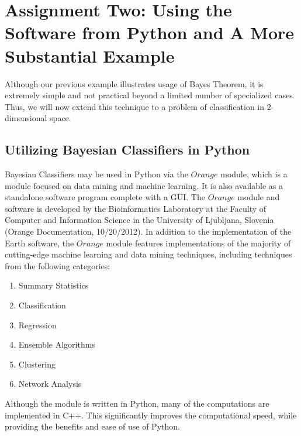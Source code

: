 

\graphicspath{{C:/Documents and Settings/amcelhinney/My Documents/GitHub/MCS507HW/MCS 507 Homework 4/MCS507--Project-3/tex/include/}}

\section{Assignment Two: Using the Software from Python and A More Substantial Example} %
\label{sec: Main Problem}
Although our previous example illustrates usage of Bayes Theorem, it is extremely simple and not practical beyond a limited number of specialized cases. Thus, we will now extend this technique to a problem of classification in 2-dimensional space. 

\subsection{Utilizing Bayesian Classifiers in Python} %

\begin{flushleft}Bayesian Classifiers may be used in Python via the $Orange$ module, which is a module focused on data mining and machine learning. It is also available as a standalone software program complete with a GUI. The $Orange$ module and software is developed by the Bioinformatics Laboratory at the Faculty of Computer and Information Science in the University of Ljubljana, Slovenia (Orange Documentation, 10/20/2012). In addition to the implementation of the Earth software, the $Orange$ module features implementations of the majority of cutting-edge machine learning and data mining techniques, including techniques from the following categories:
\end{flushleft}

\begin{enumerate}
\item Summary Statistics
\item Classification
\item Regression
\item Ensemble Algorithms
\item Clustering
\item Network Analysis
\end{enumerate}

\begin{flushleft}Although the module is written in Python, many of the computations are implemented in C++. This significantly improves the computational speed, while providing the benefits and ease of use of Python.
\end{flushleft}

